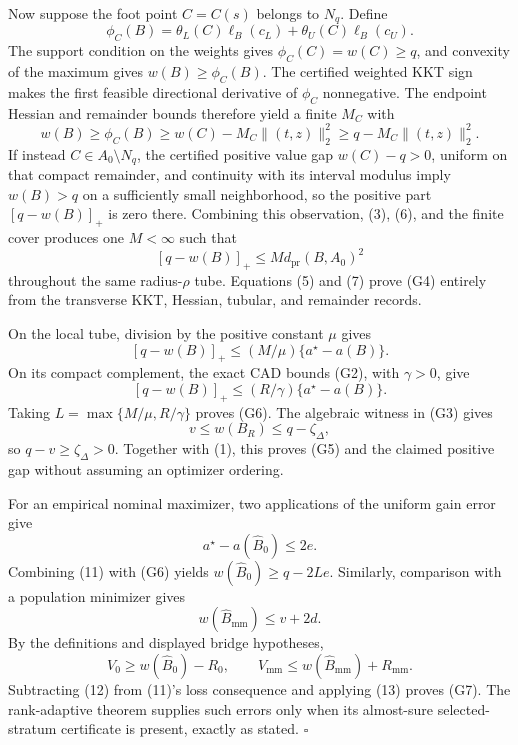 Now suppose the foot point \(C=C(s)\) belongs to \(N_q\).  Define
\[
\phi_C(B)=\theta_L(C)\ell_B(c_L)+\theta_U(C)\ell_B(c_U).
\]
The support condition on the weights gives \(\phi_C(C)=w(C)\ge q\), and convexity of the maximum gives \(w(B)\ge\phi_C(B)\).  The certified weighted KKT sign makes the first feasible directional derivative of \(\phi_C\) nonnegative.  The endpoint Hessian and remainder bounds therefore yield a finite \(M_C\) with
\[
w(B)\ge\phi_C(B)
\ge w(C)-M_C\lVert(t,z)\rVert_2^2
\ge q-M_C\lVert(t,z)\rVert_2^2.
\tag{6}
\]
If instead \(C\in A_0\setminus N_q\), the certified positive value gap \(w(C)-q>0\), uniform on that compact remainder, and continuity with its interval modulus imply \(w(B)>q\) on a sufficiently small neighborhood, so the positive part \([q-w(B)]_+\) is zero there.  Combining this observation, (3), (6), and the finite cover produces one \(M<\infty\) such that
\[
[q-w(B)]_+\le M d_{\mathrm{pr}}(B,A_0)^2
\tag{7}
\]
throughout the same radius-\(\rho\) tube.  Equations (5) and (7) prove (G4) entirely from the transverse KKT, Hessian, tubular, and remainder records.

On the local tube, division by the positive constant \(\mu\) gives
\[
[q-w(B)]_+\le(M/\mu)\{a^\star-a(B)\}.
\tag{8}
\]
On its compact complement, the exact CAD bounds (G2), with \(\gamma>0\), give
\[
[q-w(B)]_+\le(R/\gamma)\{a^\star-a(B)\}.
\tag{9}
\]
Taking \(L=\max\{M/\mu,R/\gamma\}\) proves (G6).  The algebraic witness in (G3) gives
\[
v\le w(B_R)\le q-\zeta_\Delta,
\tag{10}
\]
so \(q-v\ge\zeta_\Delta>0\).  Together with (1), this proves (G5) and the claimed positive gap without assuming an optimizer ordering.

For an empirical nominal maximizer, two applications of the uniform gain error give
\[
a^\star-a(\widehat B_0)\le2e.
\tag{11}
\]
Combining (11) with (G6) yields \(w(\widehat B_0)\ge q-2Le\).  Similarly, comparison with a population minimizer gives
\[
w(\widehat B_{\mathrm{mm}})\le v+2d.
\tag{12}
\]
By the definitions and displayed bridge hypotheses,
\[
V_0\ge w(\widehat B_0)-R_0,
\qquad
V_{\mathrm{mm}}\le w(\widehat B_{\mathrm{mm}})+R_{\mathrm{mm}}.
\tag{13}
\]
Subtracting (12) from (11)'s loss consequence and applying (13) proves (G7).  The rank-adaptive theorem supplies such errors only when its almost-sure selected-stratum certificate is present, exactly as stated. \(\square\)